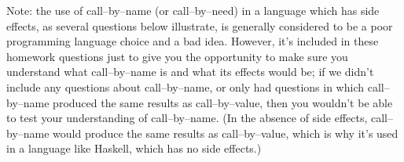 \documentclass[11pt]{article}
\begin{document}

  \vspace{-1.5mm}

  Note: the use of call--by--name (or call--by--need) in a language which has
side effects, as several questions below illustrate, is generally considered
to be a poor programming language choice and a bad idea.  However, it's
included in these homework questions just to give you the opportunity to
make sure you understand what call--by--name is and what its effects would
be; if we didn't include any questions about call--by--name, or only had
questions in which call--by--name produced the same results as
call--by--value, then you wouldn't be able to test your understanding of
call--by--name.  (In the absence of side effects, call--by--name would
produce the same results as call--by--value, which is why it's used in a
language like Haskell, which has no side effects.)
\end{document}
